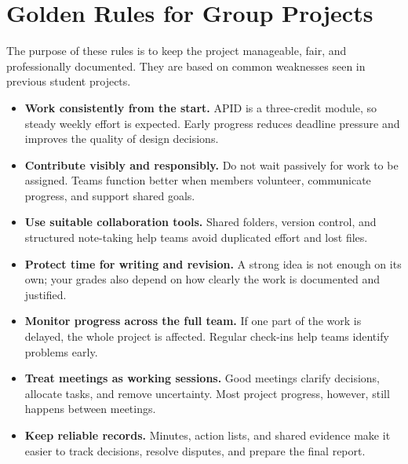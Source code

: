 \section{Golden Rules for Group Projects}

The purpose of these rules is to keep the project manageable, fair, and professionally documented. They are based on common weaknesses seen in previous student projects.

\begin{itemize}
    \item \textbf{Work consistently from the start.} APID is a three-credit module, so steady weekly effort is expected. Early progress reduces deadline pressure and improves the quality of design decisions.
    \item \textbf{Contribute visibly and responsibly.} Do not wait passively for work to be assigned. Teams function better when members volunteer, communicate progress, and support shared goals.
    \item \textbf{Use suitable collaboration tools.} Shared folders, version control, and structured note-taking help teams avoid duplicated effort and lost files.
    \item \textbf{Protect time for writing and revision.} A strong idea is not enough on its own; your grades also depend on how clearly the work is documented and justified.
    \item \textbf{Monitor progress across the full team.} If one part of the work is delayed, the whole project is affected. Regular check-ins help teams identify problems early.
    \item \textbf{Treat meetings as working sessions.} Good meetings clarify decisions, allocate tasks, and remove uncertainty. Most project progress, however, still happens between meetings.
    \item \textbf{Keep reliable records.} Minutes, action lists, and shared evidence make it easier to track decisions, resolve disputes, and prepare the final report.
\end{itemize}
